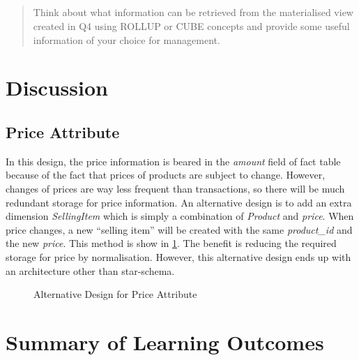 \documentclass[
  a4paper,
]{article}
\begin{document}
\hypertarget{section-4}{%
\subsection{}\label{section-4}}

\begin{quote}
Think about what information can be retrieved from the materialised view
created in Q4 using ROLLUP or CUBE concepts and provide some useful
information of your choice for management.
\end{quote}

\renewcommand*{\thesubsection}{\oldsubsection}

\hypertarget{discussion}{%
\section{Discussion}\label{discussion}}

\hypertarget{price-attribute}{%
\subsection{Price Attribute}\label{price-attribute}}

In this design, the price information is beared in the \emph{amount}
field of fact table because of the fact that prices of products are
subject to change. However, changes of prices are way less frequent than
transactions, so there will be much redundant storage for price
information. An alternative design is to add an extra dimension
\emph{SellingItem} which is simply a combination of \emph{Product} and
\emph{price}. When price changes, a new ``selling item'' will be created
with the same \emph{product\_id} and the new \emph{price}. This method
is show in \cref{fig:alter-price}. The benefit is reducing the required
storage for price by normalisation. However, this alternative design
ends up with an architecture other than star-schema.

\begin{figure}[htbp]
  \centering
  {
  \fontsize{10}{11}\selectfont
    \resizebox{0.85\textwidth}{!}{}
  }
  \caption{Alternative Design for Price Attribute}
  \label{fig:alter-price}
\end{figure}

\hypertarget{summary-of-learning-outcomes}{%
\section{Summary of Learning
Outcomes}\label{summary-of-learning-outcomes}}
\end{document}
